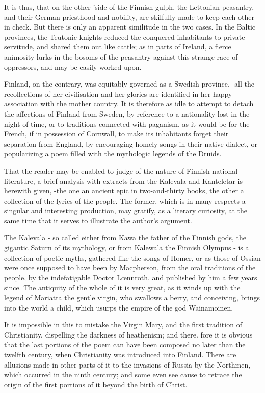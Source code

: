 \documentclass[11pt,a4paper]{article}
\begin{document}
It is thus, that on the other 'side of the Finnish gulph, the Lettonian peasantry, and their German priesthood and nobility, are skilfully made to keep each other in check. But there is only an apparent similitude in the two cases. In the Baltic provinces, the Teutonic knights reduced the conquered inhabitants to private servitude, and shared them out like cattle; as in parts of Ireland, a fierce animosity lurks in the bosoms of the peasantry against this strange race of oppressors, and may be easily worked upon.

Finland, on the contrary, was equitably governed as a Swedish province, -all the recollections of her civilisation and her glories are identified in her happy association with the mother country. It is therefore as idle to attempt to detach the affections of Finland from Sweden, by reference to a nationality lost in the night of time, or to traditions connected with paganism, as it would be for the French, if in possession of Cornwall, to make its inhabitants forget their separation from England, by encouraging homely songs in their native dialect, or popularizing a poem filled with the mythologic legends of the Druids.

That the reader may be enabled to judge of the nature of Finnish national literature, a brief analysis with extracts from the Kalevala and Kanteletar is herewith given, -the one an ancient epic in two-and-thirty books, the other a collection of the lyrics of the people. The former, which is in many respects a singular and interesting production, may gratify, as a literary curiosity, at the same time that it serves to illustrate the author's argument.

The Kalevala - so called either from Kawa the father of the Finnish gods, the gigantic Saturn of its mythology, or from Kalewala the Finnish Olympus - is a collection of poetic myths, gathered like the songs of Homer, or as those of Ossian were once supposed to have been by Macpherson, from the oral traditions of the people, by the indefatigable Doctor Lœnnroth, and published by him a few years since. The antiquity of the whole of it is very great, as it winds up with the legend of Mariatta the gentle virgin, who swallows a berry, and conceiving, brings into the world a child, which usurps the empire of the god Wainamoinen.

It is impossible in this to mistake the Virgin Mary, and the first tradition of Christianity, dispelling the darkness of heathenism; and there. fore it is obvious that the last portions of the poem can have been composed no later than the twelfth century, when Christianity was introduced into Finland. There are allusions made in other parts of it to the invasions of Russia by the Northmen, which occurred in the ninth century; and some even see cause to retrace the origin of the first portions of it beyond the birth of Christ.
\end{document}
